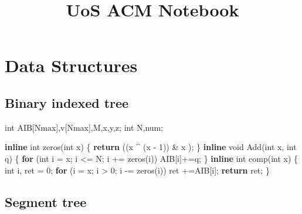 \documentclass[10pt,]{article}
\title{UoS ACM Notebook}
\author{}
\date{}
\newenvironment{Shaded}{}{}
\newcommand{\KeywordTok}[1]{\textcolor[rgb]{0.00,0.44,0.13}{\textbf{{#1}}}}
\newcommand{\DataTypeTok}[1]{\textcolor[rgb]{0.56,0.13,0.00}{{#1}}}
\newcommand{\DecValTok}[1]{\textcolor[rgb]{0.25,0.63,0.44}{{#1}}}
\newcommand{\NormalTok}[1]{{#1}}
\begin{document}
\maketitle

\section{Data Structures}

\subsection{Binary indexed tree}

\begin{Shaded}
\begin{Highlighting}[]
\DataTypeTok{int} \NormalTok{AIB[Nmax],v[Nmax],M,x,y,z;}
\DataTypeTok{int} \NormalTok{N,num;}

\KeywordTok{inline} \DataTypeTok{int} \NormalTok{zeros(}\DataTypeTok{int} \NormalTok{x) \{}
  \KeywordTok{return} \NormalTok{((x ^ (x - }\DecValTok{1}\NormalTok{)) & x );}
\NormalTok{\}}
\KeywordTok{inline} \DataTypeTok{void} \NormalTok{Add(}\DataTypeTok{int} \NormalTok{x, }\DataTypeTok{int} \NormalTok{q) \{}
  \KeywordTok{for} \NormalTok{(}\DataTypeTok{int} \NormalTok{i = x; i <= N; i += zeros(i))}
    \NormalTok{AIB[i]+=q;}
\NormalTok{\}}
\KeywordTok{inline} \DataTypeTok{int} \NormalTok{comp(}\DataTypeTok{int} \NormalTok{x) \{}
  \DataTypeTok{int} \NormalTok{i, ret = }\DecValTok{0}\NormalTok{;}
  \KeywordTok{for} \NormalTok{(i = x; i > }\DecValTok{0}\NormalTok{; i -= zeros(i))}
    \NormalTok{ret +=AIB[i];}
  \KeywordTok{return} \NormalTok{ret;}
\NormalTok{\}}
\end{Highlighting}
\end{Shaded}

\subsection{Segment tree}
\end{document}

